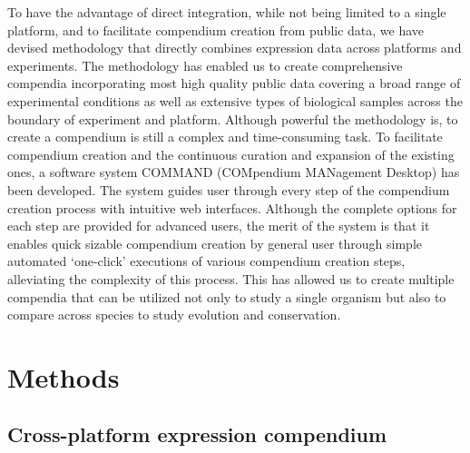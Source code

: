  To have the advantage of direct integration, while not being limited to a single platform, and to facilitate compendium creation from public data, we have devised methodology that directly combines expression data across platforms and experiments. The methodology has enabled us to create comprehensive compendia incorporating most high quality public data covering a broad range of experimental conditions as well as extensive types of biological samples across the boundary of experiment and platform. Although powerful the methodology is, to create a compendium is still a complex and time-consuming task. To facilitate compendium creation and the continuous curation and expansion of the existing ones, a software system COMMAND (COMpendium MANagement Desktop) has been developed. The system guides user through every step of the compendium creation process with intuitive web interfaces. Although the complete options for each step are provided for advanced users, the merit of the system is that it enables quick sizable compendium creation by general user through simple automated `one-click' executions of various compendium creation steps, alleviating the complexity of this process. This has allowed us to create multiple compendia that can be utilized not only to study a single organism but also to compare across species to study evolution and conservation.








\section{Methods}


\subsection{Cross-platform expression compendium}


